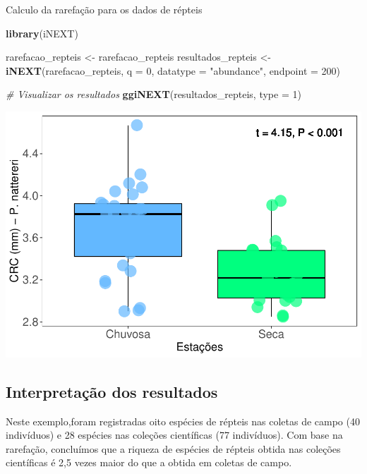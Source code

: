 \documentclass[
]{book}
\newenvironment{Shaded}{\begin{snugshade}}{\end{snugshade}}
\newcommand{\CommentTok}[1]{\textcolor[rgb]{0.56,0.35,0.01}{\textit{#1}}}
\newcommand{\DataTypeTok}[1]{\textcolor[rgb]{0.13,0.29,0.53}{#1}}
\newcommand{\DecValTok}[1]{\textcolor[rgb]{0.00,0.00,0.81}{#1}}
\newcommand{\KeywordTok}[1]{\textcolor[rgb]{0.13,0.29,0.53}{\textbf{#1}}}
\newcommand{\NormalTok}[1]{#1}
\newcommand{\StringTok}[1]{\textcolor[rgb]{0.31,0.60,0.02}{#1}}
\begin{document}
Calculo da rarefação para os dados de répteis

\begin{Shaded}
\begin{Highlighting}[]
\KeywordTok{library}\NormalTok{(iNEXT)}

\NormalTok{rarefacao_repteis <-}\StringTok{ }\NormalTok{rarefacao_repteis}
\NormalTok{resultados_repteis <-}\StringTok{ }\KeywordTok{iNEXT}\NormalTok{(rarefacao_repteis, }\DataTypeTok{q =} \DecValTok{0}\NormalTok{, }\DataTypeTok{datatype =} \StringTok{"abundance"}\NormalTok{, }\DataTypeTok{endpoint =} \DecValTok{200}\NormalTok{)}

\CommentTok{# Visualizar os resultados }
\KeywordTok{ggiNEXT}\NormalTok{(resultados_repteis, }\DataTypeTok{type =} \DecValTok{1}\NormalTok{)}
\end{Highlighting}
\end{Shaded}

\includegraphics{livro_r_ecologia_files/figure-latex/unnamed-chunk-2-1.pdf}

\hypertarget{interpretauxe7uxe3o-dos-resultados-1}{%
\subsection{Interpretação dos resultados}\label{interpretauxe7uxe3o-dos-resultados-1}}

Neste exemplo,foram registradas oito espécies de répteis nas coletas de campo (40 indivíduos) e 28 espécies nas coleções científicas (77 indivíduos). Com base na rarefação, concluímos que a riqueza de espécies de répteis obtida nas coleções científicas é 2,5 vezes maior do que a obtida em coletas de campo.
\end{document}
